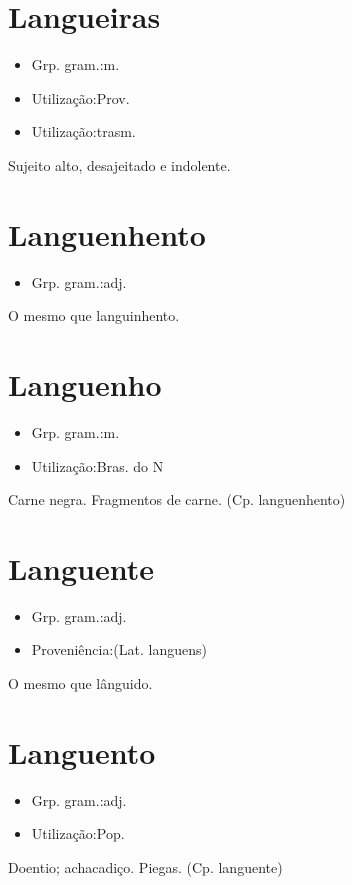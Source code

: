 \section{Langueiras}
\begin{itemize}
\item {Grp. gram.:m.}
\end{itemize}
\begin{itemize}
\item {Utilização:Prov.}
\end{itemize}
\begin{itemize}
\item {Utilização:trasm.}
\end{itemize}
Sujeito alto, desajeitado e indolente.
\section{Languenhento}
\begin{itemize}
\item {Grp. gram.:adj.}
\end{itemize}
O mesmo que \textunderscore languinhento\textunderscore .
\section{Languenho}
\begin{itemize}
\item {Grp. gram.:m.}
\end{itemize}
\begin{itemize}
\item {Utilização:Bras. do N}
\end{itemize}
Carne negra.
Fragmentos de carne.
(Cp. \textunderscore languenhento\textunderscore )
\section{Languente}
\begin{itemize}
\item {Grp. gram.:adj.}
\end{itemize}
\begin{itemize}
\item {Proveniência:(Lat. \textunderscore languens\textunderscore )}
\end{itemize}
O mesmo que \textunderscore lânguido\textunderscore .
\section{Languento}
\begin{itemize}
\item {Grp. gram.:adj.}
\end{itemize}
\begin{itemize}
\item {Utilização:Pop.}
\end{itemize}
Doentio; achacadiço.
Piegas.
(Cp. \textunderscore languente\textunderscore )

